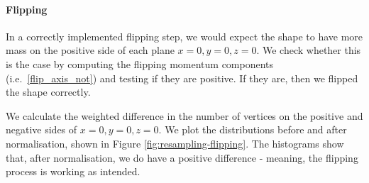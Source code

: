 \paragraph{Flipping}
In a correctly implemented flipping step, we would expect the shape to have more mass on the positive side of
each plane $x = 0, y = 0, z = 0$.
We check whether this is the case by computing the flipping momentum components (i.e.\ \ref{flip_axis_not}) and
testing if they are positive.
If they are, then we flipped the shape correctly.

We calculate the weighted difference in the number of vertices on the positive and negative sides of $x = 0, y = 0, z
= 0$.
We plot the distributions before and after normalisation, shown in Figure \ref{fig:resampling-flipping}.
The histograms show that, after normalisation, we do have a positive difference - meaning, the flipping process is working as intended.

